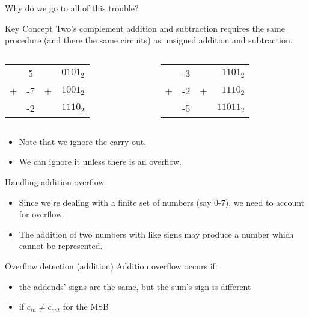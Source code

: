 \begin{frame}{Why do we go to all of this trouble?}
  \begin{block}{Key Concept}
    Two's complement addition and subtraction requires the same procedure (and there the same circuits) as unsigned addition and subtraction.
  \end{block}
  \begin{example}
    \begin{columns}
      \begin{column}{5cm}
        \begin{center}
          \begin{tabular}{rcrl}
              &  5 &   & $0101_2$\\
            + & -7 & + & $1001_2$\\
            \hline
              & -2 &   & $1110_2$
          \end{tabular}
        \end{center}
      \end{column}
      \begin{column}{5cm}
        \begin{center}
          \begin{tabular}{rcrr}
              & -3 &   & $1101_2$\\
            + & -2 & + & $1110_2$\\
            \hline
              & -5 &   & $11011_2$
          \end{tabular}
        \end{center}
      \end{column}
    \end{columns}
  \end{example}
\end{frame}

\begin{itemize}
  \item Note that we ignore the carry-out.
  \item We can ignore it unless there is an overflow.
\end{itemize}

\begin{frame}{Handling addition overflow}
  \begin{itemize}
    \item Since we're dealing with a finite set of numbers (say 0-7), we need to account for overflow.
    \item The addition of two numbers with like signs may produce a number which cannot be represented.
  \end{itemize}
  \begin{block}{Overflow detection (addition)}
      Addition overflow occurs if:
    \begin{itemize}
      \item the addends' signs are the same, but the sum's sign is different
      \item if $c_{in} \neq c_{out}$ for the MSB
    \end{itemize}
  \end{block}
\end{frame}


